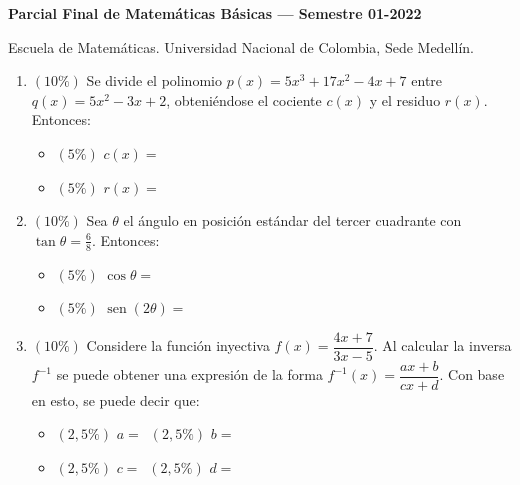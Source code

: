 \documentclass[11pt]{article}
\newcommand{\resp}{\ \underline{\hspace{3.2cm}}}
\begin{document}
{\large\bfseries Parcial Final de Matemáticas Básicas --- Semestre 01-2022}

\medskip
\noindent Escuela de Matemáticas. Universidad Nacional de Colombia, Sede Medellín.

\begin{enumerate}
\item $(10\%)$ Se divide el polinomio $p(x) = 5x^3 + 17x^2 - 4x + 7$ entre $q(x) = 5x^2 - 3x + 2$, obteniéndose el cociente $c(x)$ y el residuo $r(x)$. Entonces:
\begin{itemize}
\item[] $(5\%)$ $c(x) = $\resp
\item[] $(5\%)$ $r(x) = $\resp
\end{itemize}

\item $(10\%)$ Sea $\theta$ el ángulo en posición estándar del tercer cuadrante con $\tan\theta = \tfrac{6}{8}$. Entonces:
\begin{itemize}
\item[] $(5\%)$ $\cos\theta = $\resp
\item[] $(5\%)$ $\operatorname{sen}(2\theta) = $\resp
\end{itemize}

\item $(10\%)$ Considere la función inyectiva $f(x) = \dfrac{4x + 7}{3x - 5}$. Al calcular la inversa $f^{-1}$ se puede obtener una expresión de la forma $f^{-1}(x) = \dfrac{ax + b}{cx + d}$. Con base en esto, se puede decir que:
\begin{itemize}
\item[] $(2{,}5\%)$ $a = $\resp \qquad $(2{,}5\%)$ $b = $\resp
\item[] $(2{,}5\%)$ $c = $\resp \qquad $(2{,}5\%)$ $d = $\resp
\end{itemize}


\end{enumerate}
\end{document}
